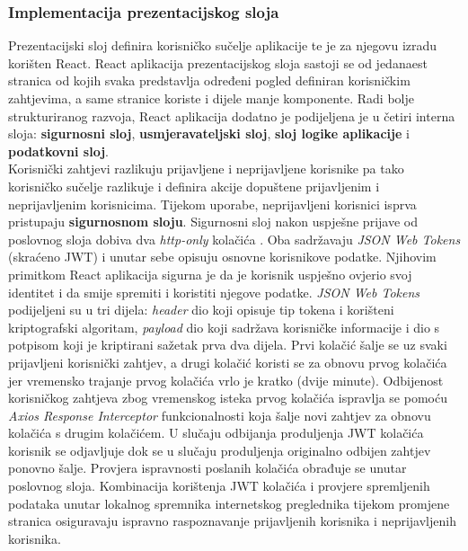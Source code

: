 \documentclass[times, utf8, zavrsni, numeric]{fer}
\begin{document}
			\subsubsection{Implementacija prezentacijskog sloja}
			Prezentacijski sloj definira korisničko sučelje aplikacije te je za njegovu izradu korišten React. React aplikacija prezentacijskog sloja sastoji se od jedanaest stranica od kojih svaka predstavlja određeni pogled definiran korisničkim zahtjevima, a same stranice koriste i dijele manje komponente. Radi bolje strukturiranog razvoja, React aplikacija dodatno je podijeljena je u četiri interna sloja: \textbf{sigurnosni sloj}, \textbf{usmjeravateljski sloj}, \textbf{sloj logike aplikacije} i \textbf{podatkovni sloj}.\\
			Korisnički zahtjevi razlikuju prijavljene i neprijavljene korisnike pa tako korisničko sučelje razlikuje i definira akcije dopuštene prijavljenim i neprijavljenim korisnicima. Tijekom uporabe, neprijavljeni korisnici isprva pristupaju \textbf{sigurnosnom sloju}. Sigurnosni sloj nakon uspješne prijave od poslovnog sloja dobiva dva \textit{http-only} kolačića . Oba sadržavaju \textit{JSON Web Tokens}\cite{jwt2021} (skraćeno JWT) i unutar sebe opisuju osnovne korisnikove podatke. Njihovim primitkom React aplikacija sigurna je da je korisnik uspješno ovjerio svoj identitet i da smije spremiti i koristiti njegove podatke.
		 	\textit{JSON Web Tokens} podijeljeni su u tri dijela: \textit{header} dio koji opisuje tip tokena i korišteni kriptografski algoritam, \textit{payload} dio koji sadržava korisničke informacije 
			i dio s potpisom koji je kriptirani sažetak prva dva dijela. Prvi kolačić šalje se uz svaki prijavljeni korisnički zahtjev, a drugi kolačić koristi se za obnovu prvog kolačića jer vremensko trajanje prvog kolačića vrlo je kratko (dvije minute). Odbijenost korisničkog zahtjeva zbog vremenskog isteka prvog kolačića ispravlja se pomoću \textit{Axios Response Interceptor} funkcionalnosti koja šalje novi zahtjev za obnovu kolačića s drugim kolačićem. U slučaju odbijanja produljenja JWT kolačića korisnik se odjavljuje dok se u slučaju produljenja originalno odbijen zahtjev ponovno  šalje. Provjera ispravnosti poslanih kolačića obrađuje se unutar poslovnog sloja. Kombinacija korištenja JWT kolačića i provjere spremljenih podataka unutar lokalnog spremnika internetskog preglednika tijekom promjene stranica osiguravaju ispravno raspoznavanje prijavljenih korisnika i neprijavljenih korisnika.
\end{document}
